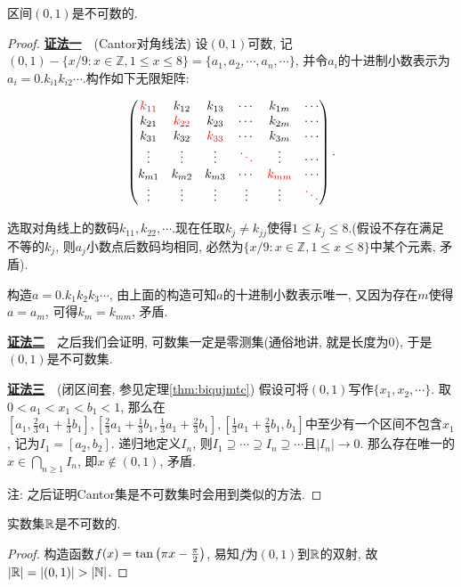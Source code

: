 \begin{proposition}{}
	区间$(0, 1)$是不可数的.
\end{proposition}
\begin{proof}
	\underline{\textbf{证法一}}~~(Cantor对角线法) 设$(0, 1)$可数, 记$(0, 1)-\{ x/9: x \in \mathbb{Z},  1 \leq x \leq 8 \}=\{ a_1,  a_2,  \cdots , a_n , \cdots \}$, 并令$a_i$的十进制小数表示为$a_i=0.k_{i1}k_{i2}\cdots$.构作如下无限矩阵: 
	
	$$\begin{pmatrix}
 \color{red} k_{11} & k_{12} & k_{13} & \cdots & k_{1m} & \cdots \\
 k_{21} & \color{red} k_{22} & k_{23} & \cdots & k_{2m} & \cdots \\
 k_{31} & k_{32} & \color{red} k_{33} & \cdots & k_{3m} & \cdots \\
 \vdots & \vdots & \vdots & \color{red} \ddots & \vdots & \cdots \\
 k_{m1} & k_{m2} & k_{m3} & \cdots & \color{red} k_{mm} & \cdots \\
 \vdots & \vdots & \vdots & \vdots & \vdots & \color{red} \ddots
\end{pmatrix}.$$

	选取对角线上的数码$k_{11}, k_{22}, \cdots $.现在任取$k_j \neq k_{jj}$使得$1 \leq k_j \leq 8$.(假设不存在满足不等的$k_j$, 则$a_j$小数点后数码均相同, 必然为$\{ x/9: x \in \mathbb{Z},  1 \leq x \leq 8 \}$中某个元素, 矛盾).
	
	构造$a=0.k_1k_2k_3\cdots$, 由上面的构造可知$a$的十进制小数表示唯一, 又因为存在$m$使得$a=a_m$, 可得$k_m=k_{mm}$, 矛盾.
	
	\underline{\textbf{证法二}}~~之后我们会证明, 可数集一定是零测集(通俗地讲, 就是长度为$0$), 于是$(0,1)$是不可数集. 
	
	\underline{\textbf{证法三}}~~(闭区间套, 参见定理\ref{thm:biqujmtc}) 假设可将$(0,1)$写作$\{ x_1,x_2,\cdots \}$. 取$0<a_1<x_1<b_1<1$, 那么在$[a_1, \frac{2}{3}a_1+\frac{1}{3}b_1], [\frac{2}{3}a_1+\frac{1}{3}b_1, \frac{1}{3}a_1+\frac{2}{3}b_1], [\frac{1}{3}a_1+\frac{2}{3}b_1 , b_1]$中至少有一个区间不包含$x_1$, 记为$I_1=[a_2,b_2]$. 递归地定义$I_n$, 则$I_1 \supseteq \cdots \supseteq I_n \supseteq \cdots$且$|I_n| \to 0$. 那么存在唯一的$x \in \bigcap_{n \geq 1}I_n$, 即$x \notin (0,1)$, 矛盾. 
	
	注: 之后证明Cantor集是不可数集时会用到类似的方法. 
\end{proof}

\begin{corollary}{}
	实数集$\mathbb{R}$是不可数的.
\end{corollary}
\begin{proof}
	构造函数$f(x)=\tan \left( \pi x-\frac{\pi}{2} \right)$, 易知$f$为$(0, 1)$到$\mathbb{R}$的双射, 故$|\mathbb{R} | = |(0, 1)| > |\mathbb{N} |$.
\end{proof}


